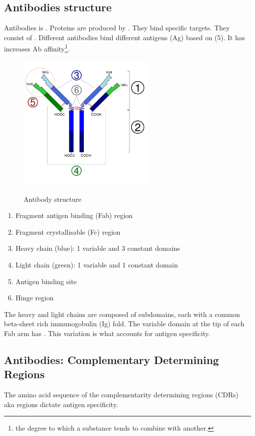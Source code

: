 \subsection{Antibodies structure}
Antibodies is . Proteins are produced by . They bind specific targets. They consist of . Different antibodies bind different antigens (Ag) based on  (5). It has  increases Ab affinity\footnote{the degree to which a substance tends to combine with another.}.
\begin{figure}[h]
\centering
\includegraphics[width=0.6\textwidth]{images/Immunoglobulin_basic_unit.svg.png}\\[.1in]
\caption{Antibody structure}
\end{figure}
\FloatBarrier
\begin{enumerate}[noitemsep]
    \item Fragment antigen binding (Fab) region
    \item Fragment crystallisable (Fc) region
    \item Heavy chain (blue): 1 variable and 3 constant domains
    \item Light chain (green): 1 variable and 1 constant domain
    \item Antigen binding site
    \item Hinge region
\end{enumerate}
The heavy and light chains are composed of subdomains, each with a common beta-sheet rich immunogobulin (Ig) fold. The variable domain at the tip of each Fab arm has . This variation is what accounts for antigen specificity.
\subsection{Antibodies: Complementary Determining Regions}
The amino acid sequence of the complementarity determining regions (CDRs) aka  regions dictate antigen specificity.
